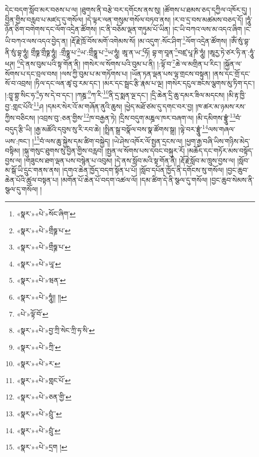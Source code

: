 དེང་བདག་སློབ་མར་བཅས་པ་ལ། །ཐུགས་ནི་བརྩེ་བར་དགོངས་ནས་སུ། །ཚོགས་པ་ཐམས་ཅད་དཀྱིལ་འཁོར་དུ། །བྱིན་གྱིས་བརླབ་པ་མཛད་དུ་གསོལ། །དེ་ལྟར་ལན་གསུམ་གསོལ་བཏབ་ནས། །ར་བ་དྲ་བས་མཚམས་བཅད་དོ། །ཧཱུཾ་ཉོན་ཅིག་བགེགས་དང་ལོག་འདྲེན་ཚོགས། །ང་ནི་བཅོམ་ལྡན་གཏུམ་པོ་ཡིན། །ང་ཡི་བཀའ་ལས་མ་འདའ་ཞིག །ང་ཡི་བཀའ་ལས་འདའ་བྱེད་ན། །རྡོ་རྗེ་ཁྲོ་བོས་མགོ་འགེམས་སོ། །མ་འདུག་:སོང་ཤིག་\footnote{«སྣར་»«པེ་»སོང་ཞིག་}ལོག་འདྲེན་ཚོགས། །ཨོཾ་སུཾ་བྷ་ནི་སུཾ་བྷ་ཧཱུཾ། གྲྀཧྞ་གྲྀཧྞ་ཧཱུཾ། :གྲྀཧྞཱ་པ་\footnote{«སྣར་»«པེ་»གྲྀཧྞ་པ་}ཡ་:གྲྀཧྞཱ་པ་\footnote{«སྣར་»«པེ་»གྲྀཧྞ་པ་}ཡ་ཧཱུཾ། ཨཱ་ན་ཡ་\footnote{«སྣར་»«པེ་»ཡཱ་}ཧོ། བྷ་ག་བཱན་\footnote{«སྣར་»«པེ་»ཝན་}བཛྲ་པཱ་ཎི་ཧཱུཾ། །ཨཱརྱ་ཏེ་ཙར་ཧི་ན་:ཧཱུཾ་ཕཊ། \footnote{«སྣར་»«པེ་»ཧཱུཾ།། །། }དེ་ནས་བུམ་པའི་སྟ་གོན་ནི། །གསེར་ལ་སོགས་པའི་བུམ་པ་ནི། །:ལྟོ་བ་\footnote{«པེ་»ལྟོ་བོ་}ཆེ་ལ་མགྲིན་པ་རིང་། །སྐྱོན་ལ་སོགས་པ་དང་བྲལ་བས། །ལས་ཀྱི་བུམ་པ་མ་གཏོགས་པ། །ཡོན་ཏན་ལྡན་པས་ལྷ་གྲངས་བསྟུན། །ནས་དང་གྲོ་དང་སོ་བ་འབྲས། །ཏིལ་དང་ལན་ཚྭ་བུ་རམ་དང་། །མར་དང་སྦྲང་རྩི་རྣམ་པ་ལྔ། །གསེར་དངུལ་ཟངས་ལྕགས་མུ་ཏིག་དང་། །:བྱཱ་གྷྲ་སིང་ཧ་\footnote{«སྣར་»«པེ་»བྱ་ཀྲི་སེང་ཀྲི་ཧ་སི་}ཧ་ས་དེ་བ་དང་། །ཀཎྜ་\footnote{«སྣར་»«པེ་»ཀྲི་}ཀ་རི་\footnote{«སྣར་»«པེ་»ར་}ནི་དྲ་སྨན་ལྔ་དང་། །དྲི་ཆེན་དྲི་ཆུ་དམར་ཟིལ་མདངས། །མི་རྟ་ཁྱི་བྱ་:གླང་པོའི་\footnote{«སྣར་»«པེ་»གླང་པོ་}ཤ །དམར་སེར་འོ་མ་གཞོན་ནུའི་ཆུས། །ཕྱེད་མཐོ་ཙམ་དུ་དགང་བར་བྱ། །ཁ་ཚར་མ་ཉམས་རས་ཀྱིས་བཅིངས། །འབྲས་བུ་:ཅན་གྱིས་\footnote{«སྣར་»«པེ་»ཅན་གྱི་}ཁ་བརྒྱན་ཏེ། །དྲིས་བདུག་མཎྜལ་ཁར་བཞག་ལ། །མི་དམིགས་བྷྲཱུཾ་\footnote{«སྣར་»«པེ་»བྲུཾ་་}བཾ་བདུད་རྩི་ཡི། །རྒྱ་མཚོའི་དབུས་སུ་རི་རབ་ཆེ། །སྤྲིན་སྒྲ་བསྣོལ་བས་སྣ་ཚོགས་སྒྲ། །ལྟེ་བར་བྷྲཱུཾ་\footnote{«སྣར་»«པེ་»བྲུཾ་}ལས་གཞལ་ཡས་:ཁང་། །\footnote{«སྣར་»«པེ་»དྲག །}བཾ་ལས་ཆུ་སྐྱེས་དམ་ཚིག་བསྐྱེད། །ཡེ་ཤེས་འཁོར་ལོ་སྤྱན་དྲངས་ལ། །ཕྱག་རྒྱ་བཞི་ཡིས་གཉིས་མེད་བསྟིམ། །སྐུ་གསུང་ཐུགས་སུ་བྱིན་གྱིས་བརླབ། །སྤྱན་ལ་སོགས་པས་དབང་བསྐུར་རོ། །མཆོད་དང་གཏོར་མས་བསྟོད་བྱས་ལ། །གཟུངས་ཐག་ལྡན་པས་བསྙེན་པ་འབུམ། །དེ་ནས་སློབ་མའི་སྟ་གོན་ནི། །རྡོ་རྗེ་སློབ་མ་ཁྲུས་བྱས་ལ། །སློབ་མ་སྒོ་ཡི་དྲུང་གནས་ནས། །དགའ་ཆེན་ཁྱོད་བདག་སྟོན་པ་པོ། །སློབ་དཔོན་ཁྱོད་ནི་དགོངས་སུ་གསོལ། །བྱང་ཆུབ་ཆེན་པོའི་ཚུལ་བསྟན་པ། །མགོན་པོ་ཆེན་པོ་བདག་འཚལ་ལོ། །དམ་ཚིག་དེ་ནི་སྩལ་དུ་གསོལ། །བྱང་ཆུབ་སེམས་ནི་སྩལ་དུ་གསོལ། །
